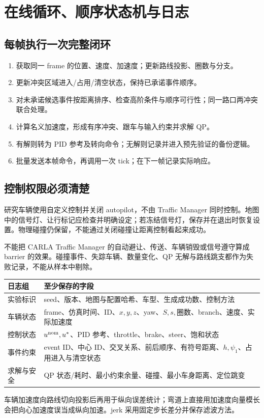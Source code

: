 \documentclass[UTF8,fontset=fandol,11pt,a4paper]{ctexart}
\newcommand{\page}[1]{\clearpage\section{#1}}
\begin{document}
\page{在线循环、顺序状态机与日志}
\subsection{每帧执行一次完整闭环}
\begin{enumerate}
\item 获取同一 frame 的位置、速度、加速度；更新路线投影、圈数与分支。
\item 更新冲突区域进入/占用/清空状态，保持已承诺事件顺序。
\item 对未承诺候选事件按距离排序、检查高阶条件与顺序可行性；同一路口两冲突联合处理。
\item 计算名义加速度，形成有序冲突、跟车与输入约束并求解 QP。
\item 有解则转为 PID 参考及转向命令；无解则记录并进入预先验证的备份逻辑。
\item 批量发送本帧命令，再调用一次 tick；在下一帧记录实际响应。
\end{enumerate}
\subsection{控制权限必须清楚}
研究车辆使用自定义控制并关闭 autopilot，不由 Traffic Manager 同时控制。地图中的信号灯、让行标记应检查并明确设定；若冻结信号灯，保存并在退出时恢复设置。物理碰撞仍保留，不能通过关闭碰撞让距离控制看起来成功。

不能把 CARLA Traffic Manager 的自动避让、传送、车辆销毁或信号遵守算成 barrier 的效果。碰撞事件、失踪车辆、数量变化、QP 无解与路线跳支都作为失败记录，不能从样本中剔除。

\begin{center}\small
\begin{tabular}{P{3.1cm}P{10.3cm}}\toprule
日志组 & 至少保存的字段\\\midrule
实验标识 & seed、版本、地图与配置哈希、车型、生成成功数、控制方法\\
车辆状态 & frame、仿真时间、ID、$x,y,z$、yaw、$S,s,$圈数、branch、速度、实际加速度\\
控制状态 & $u^{\mathrm{nom}},u^*$、PID 参考、throttle、brake、steer、饱和状态\\
事件约束 & event ID、中心 ID、交叉关系、前后顺序、有符号距离、$h,\psi_1$、占用进入与清空状态\\
求解与安全 & QP 状态/耗时、最小约束余量、碰撞、最小车身距离、定位跳变\\\bottomrule
\end{tabular}\end{center}
车辆加速度向路线切向投影后再用于纵向误差统计；弯道上直接用加速度向量模长会把向心加速度误当成纵向加速。jerk 采用固定步长差分并保存滤波方法。
\end{document}
